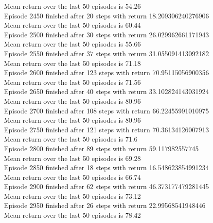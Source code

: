 \documentclass{article}
\begin{document}
Mean return over the last 50 episodes is 54.26\\
Episode 2450 finished after 20 steps with return 18.209306240276906\\
Mean return over the last 50 episodes is 60.44\\
Episode 2500 finished after 30 steps with return 26.029962661171943\\
Mean return over the last 50 episodes is 55.66\\
Episode 2550 finished after 37 steps with return 31.055091413092182\\
Mean return over the last 50 episodes is 71.18\\
Episode 2600 finished after 123 steps with return 70.95115056900356\\
Mean return over the last 50 episodes is 71.56\\
Episode 2650 finished after 40 steps with return 33.102824143031924\\
Mean return over the last 50 episodes is 80.96\\
Episode 2700 finished after 108 steps with return 66.22455991010975\\
Mean return over the last 50 episodes is 80.96\\
Episode 2750 finished after 121 steps with return 70.36134126007913\\
Mean return over the last 50 episodes is 71.6\\
Episode 2800 finished after 89 steps with return 59.117982557745\\
Mean return over the last 50 episodes is 69.28\\
Episode 2850 finished after 18 steps with return 16.548623854991234\\
Mean return over the last 50 episodes is 66.74\\
Episode 2900 finished after 62 steps with return 46.373177479281445\\
Mean return over the last 50 episodes is 73.12\\
Episode 2950 finished after 26 steps with return 22.99568541948446\\
Mean return over the last 50 episodes is 78.42\\
\end{document}
